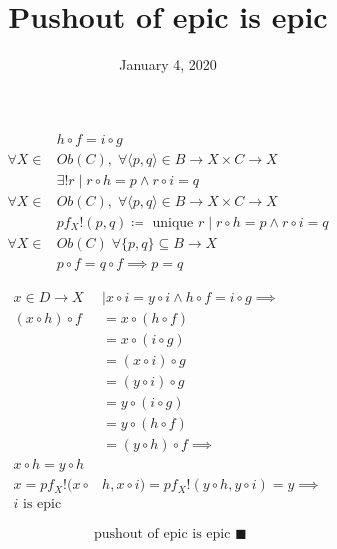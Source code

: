 \documentclass[11pt]{article}
\date{January 4, 2020}
\title{Pushout of epic is epic}
\begin{document}
\begin{multicols}{2}

\columnbreak

\begin{align*}
& h \circ f = i \circ g \\
\forall X \in & Ob(C),
  \; \forall \langle p, q \rangle \in B \rightarrow X \times C \rightarrow X \\
& \exists! r \mid r \circ h = p \land r \circ i = q \\
\forall X \in & Ob(C),
  \; \forall \langle p, q \rangle \in B \rightarrow X \times C \rightarrow X \\
& pf_X!(p, q) \coloneqq \text{ unique } r \mid 
                            r \circ h = p \land r \circ i = q \\
\forall X \in & Ob(C) \;
  \forall \{p, q\} \subseteq B \rightarrow X \\
& p \circ f = q \circ f \implies p = q 
\end{align*}

\end{multicols}

\begin{equation*}
\begin{aligned}
x \in D \rightarrow X &\mid x \circ i = y \circ i \land
  h \circ f = i \circ g \implies \\
(x \circ h) \circ f &= x \circ (h \circ f) \\
                    &= x \circ (i \circ g) \\
                    &= (x \circ i) \circ g \\
                    &= (y \circ i) \circ g \\
                    &= y \circ (i \circ g) \\
                    &= y \circ (h \circ f) \\
                    &= (y \circ h) \circ f \implies \\
x \circ h = y \circ h& \\
x = pf_X!(x \circ& h, x \circ i) = pf_X!(y \circ h, y \circ i) = y \implies \\
i \text{ is epic }&
\end{aligned}
\end{equation*}

\hrulefill

$$ \text{ pushout of epic is epic } \blacksquare $$
\end{document}
